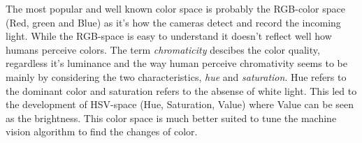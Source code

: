 The most popular and well known color space is probably the RGB-color space (Red, green and Blue) as it's how the cameras detect and record the incoming light. While the RGB-space is easy to understand it doesn't reflect well how humans perceive colors. The term \textit{chromaticity} descibes the color quality, regardless it's luminance and the way human perceive chromativity seems to be mainly by considering the two characteristics, \textit{hue} and \textit{saturation}. Hue refers to the dominant color and saturation refers to the absense of white light. This led to the development of HSV-space (Hue, Saturation, Value) where Value can be seen as the brightness. This color space is much better suited to tune the machine vision algorithm to find the changes of color. 

